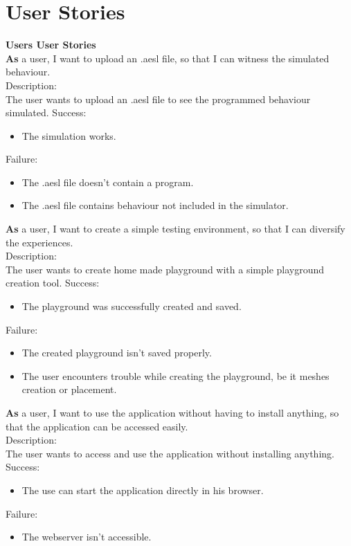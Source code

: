 \documentclass{scrbook}
\begin{document}
\section{User Stories}
\textbf{\large Users User Stories}\\
\textbf{As} a user, I want to upload an .aesl file, so that I can witness the simulated behaviour. \\
Description:\\
The user wants to upload an .aesl file to see the programmed behaviour simulated.
Success:\\
\begin{itemize}
  \item The simulation works.
\end{itemize}
Failure:\\
\begin{itemize}
  \item The .aesl file doesn't contain a program.
  \item The .aesl file contains behaviour not included in the simulator.
\end{itemize}


\textbf{As} a user, I want to create a simple testing environment, so that I can diversify the experiences. \\
Description:\\
The user wants to create home made playground with a simple playground creation tool.
Success:\\
\begin{itemize}
  \item The playground was successfully created and saved.
\end{itemize}
Failure:\\
\begin{itemize}
  \item The created playground isn't saved properly.
  \item The user encounters trouble while creating the playground, be it meshes creation or placement.
\end{itemize}


\textbf{As} a user, I want to use the application without having to install anything, so that the application can be accessed easily. \\
Description:\\
The user wants to access and use the application without installing anything.
Success:\\
\begin{itemize}
  \item The use can start the application directly in his browser.
\end{itemize}
Failure:\\
\begin{itemize}
  \item The webserver isn't accessible.
\end{itemize}
\end{document}
